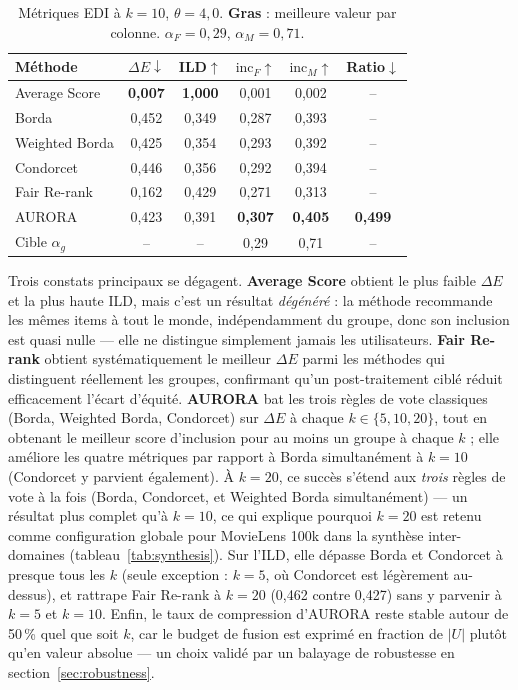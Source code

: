 \documentclass[12pt]{report}
\begin{document}
\begin{table}[h!]
\centering
\caption{Métriques EDI à $k=10$, $\theta=4{,}0$. \textbf{Gras} : meilleure
valeur par colonne. $\alpha_F=0{,}29$, $\alpha_M=0{,}71$.}
\label{tab:k10}
\begin{tabular}{lccccc}
\hline
Méthode & $\Delta E\downarrow$ & ILD$\uparrow$ & $\mathrm{inc}_F\uparrow$
       & $\mathrm{inc}_M\uparrow$ & Ratio$\downarrow$ \\
\hline
Average Score & \textbf{0,007} & \textbf{1,000} & 0,001 & 0,002 & -- \\
Borda         & 0,452 & 0,349 & 0,287 & 0,393 & -- \\
Weighted Borda & 0,425 & 0,354 & 0,293 & 0,392 & -- \\
Condorcet     & 0,446 & 0,356 & 0,292 & 0,394 & -- \\
Fair Re-rank  & 0,162 & 0,429 & 0,271 & 0,313 & -- \\
AURORA          & 0,423 & 0,391 & \textbf{0,307} & \textbf{0,405} & \textbf{0,499} \\
\hline
Cible $\alpha_g$ & -- & -- & 0,29 & 0,71 & -- \\
\hline
\end{tabular}
\end{table}

Trois constats principaux se dégagent. \textbf{Average Score} obtient le
plus faible $\Delta E$ et la plus haute ILD, mais c'est un résultat
\emph{dégénéré} : la méthode recommande les mêmes items à tout le monde,
indépendamment du groupe, donc son inclusion est quasi nulle --- elle ne
distingue simplement jamais les utilisateurs. \textbf{Fair Re-rank}
obtient systématiquement le meilleur $\Delta E$ parmi les méthodes qui
distinguent réellement les groupes, confirmant qu'un post-traitement
ciblé réduit efficacement l'écart d'équité. \textbf{AURORA} bat les trois
règles de vote classiques (Borda, Weighted Borda, Condorcet) sur
$\Delta E$ à chaque $k \in \{5,10,20\}$, tout en obtenant le meilleur
score d'inclusion pour au moins un groupe à chaque $k$ ; elle améliore
les quatre métriques par rapport à Borda simultanément à $k=10$
(Condorcet y parvient également). À $k=20$, ce succès s'étend aux
\emph{trois} règles de vote à la fois (Borda, Condorcet, et Weighted
Borda simultanément) --- un résultat plus complet qu'à $k=10$, ce qui
explique pourquoi $k=20$ est retenu comme configuration globale pour
MovieLens 100k dans la synthèse inter-domaines (tableau~\ref{tab:synthesis}).
Sur l'ILD, elle dépasse Borda
et Condorcet à presque tous les $k$ (seule exception : $k=5$, où
Condorcet est légèrement au-dessus), et rattrape Fair Re-rank à $k=20$
(0,462 contre 0,427) sans y parvenir à $k=5$ et $k=10$. Enfin, le taux de
compression d'AURORA reste stable autour de 50\,\% quel que soit $k$,
car le budget de fusion est exprimé en fraction de $|U|$ plutôt qu'en
valeur absolue --- un choix validé par un balayage de robustesse en
section~\ref{sec:robustness}.
\end{document}
